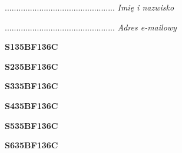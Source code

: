 \begin{turn}{90}\begin{minipage}{\linewidth} \vspace{20mm} ................................................  \textit{Imię i nazwisko}\end{minipage}\end{turn}

\begin{turn}{90}\begin{minipage}{\linewidth} \vspace{20mm} ................................................  \textit{Adres e-mailowy}\end{minipage}\end{turn}

\begin{turn}{90}\huge \begin{minipage}{\linewidth} \vspace{10mm}\textbf{S135BF136C}\end{minipage}\end{turn}

\begin{turn}{90}\huge \begin{minipage}{\linewidth} \vspace{10mm}\textbf{S235BF136C}\end{minipage}\end{turn}

\begin{turn}{90}\huge \begin{minipage}{\linewidth} \vspace{10mm}\textbf{S335BF136C}\end{minipage}\end{turn}

\begin{turn}{90}\huge \begin{minipage}{\linewidth} \vspace{10mm}\textbf{S435BF136C}\end{minipage}\end{turn}

\begin{turn}{90}\huge \begin{minipage}{\linewidth} \vspace{10mm}\textbf{S535BF136C}\end{minipage}\end{turn}

\begin{turn}{90}\huge \begin{minipage}{\linewidth} \vspace{10mm}\textbf{S635BF136C}\end{minipage}\end{turn}

